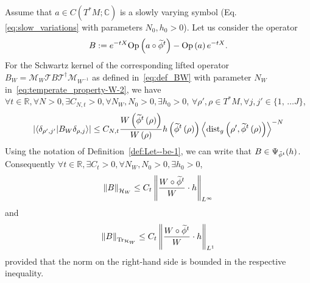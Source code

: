 \documentclass[AHL,Unicode,longabstracts,published]{cedram}
\newcommand{\clT}{\mathcal{T}}
\newcommand{\clH}{\mathcal{H}}
\newcommand{\clM}{\mathcal{M}}
\newcommand{\dist}{\mathrm{dist}}
\newcommand{\Opp}{\mathrm{Op}}
\newcommand{\Tr}{\mathrm{Tr}}
\newcommand{\bbR}{\mathbb{R}}
\newcommand{\bbC}{\mathbb{C}}
\let\oldtilde\tilde
\renewcommand*{\tilde}[1]{\mathchoice{\widetilde{#1}}{\widetilde{#1}}{\oldtilde{#1}}{\oldtilde{#1}}}
\let\oldexists\exists
\renewcommand*{\exists}{\mathrel{\oldexists}}
\let\oldforall\forall
\renewcommand*{\forall}{\mathrel{\oldforall}}
\newcommand{\clH}{\mathcal{H}}
\newcommand{\bbR}{\mathbb{R}}
\begin{document}
\begin{tcolorbox}[enhanced, frame style={teal!80}, interior style={cyan!0}, breakable]
\begin{theo}\label{thm:Egorov.-For-any}
Assume that $a\in C(T^{*}M;\bbC)$ is a slowly varying symbol (Eq. \eqref{eq:slow_variations} with parameters $N_{0},h_{0}>0$). Let us consider the operator
\[
B:=e^{-tX}\Opp \left(a\circ\tilde{\phi}^{t}\right)-\Opp \left(a\right)e^{-tX}.
\]
For the Schwartz kernel of the corresponding lifted operator $B_{W}=\clM_{W}\clT B\clT^{\dagger}\clM_{W^{-1}}$ as defined in~\eqref{eq:def_BW} with parameter $N_{W}$ in~\eqref{eq:temperate_property-W-2}, we have $\forall t\in\bbR,\forall N>0,\exists C_{N,t}>0,\forall N_{W},N_{0}>0,\exists h_{0}>0$, $\forall\rho',\rho\in T^{*}M,\forall j,j'\in\{ 1,\,\ldots J\} $,
\[
\left|\langle\delta_{\rho',j'}|B_{W}\delta_{\rho,j}\rangle\right|\leq C_{N,t}\frac{W\left(\tilde{\phi}^{t}\left(\rho\right)\right)}{W\left(\rho\right)}h\left(\tilde{\phi}^{t}\left(\rho\right)\right)\left\langle \dist_{g}\left(\rho',\tilde{\phi}^{t}\left(\rho\right)\right)\right\rangle ^{-N}
\]
Using the notation of Definition~\ref{def:Let--be-1}, we can write that $B\in\Psi_{\tilde{\phi}^{t}}(h)$. Consequently $\forall t\in\bbR,\exists C_{t}>0,\forall N_{W},N_{0}>0,\exists h_{0}>0$,
\begin{equation}\label{eq:norm_Egorov_PDO}
\left\Vert B\right\Vert _{\clH _{W}}\leq C_{t}\left\Vert \frac{W\circ\tilde{\phi}^{t}}{W}\cdot h\right\Vert _{L^{\infty}}
\end{equation}
and
\begin{equation}\label{eq:Egorov_Trace}
\left\Vert B\right\Vert _{\Tr_{\clH _{W}}}\leq C_{t}\left\Vert \frac{W\circ\tilde{\phi}^{t}}{W}\cdot h\right\Vert _{L^{1}}
\end{equation}
provided that the norm on the right-hand side is bounded in the respective inequality.
\end{theo}
\end{tcolorbox}
\end{document}
